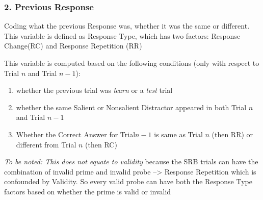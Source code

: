 \documentclass[
]{article}
\providecommand{\tightlist}{%
  \setlength{\itemsep}{0pt}\setlength{\parskip}{0pt}}
\begin{document}
\hypertarget{previous-response}{%
\subsubsection{2. Previous Response}\label{previous-response}}

Coding what the previous Response was, whether it was the same or
different. This variable is defined as Response Type, which has two
factors: Response Change(RC) and Response Repetition (RR)

This variable is computed based on the following conditions (only with
respect to Trial \(n\) and Trial \(n-1\)):

\begin{enumerate}
\def\labelenumi{\arabic{enumi}.}
\tightlist
\item
  whether the previous trial was \emph{learn} or a \emph{test} trial
\item
  whether the same Salient or Nonsalient Distractor appeared in both
  Trial \(n\) and Trial \(n-1\)
\item
  Whether the Correct Answer for Trial\(n-1\) is same as Trial \(n\)
  (then RR) or different from Trial \(n\) (then RC)
\end{enumerate}

\emph{To be noted: This does not equate to validity} because the SRB
trials can have the combination of invalid prime and invalid probe
--\textgreater{} Response Repetition which is confounded by Validity. So
every valid probe can have both the Response Type factors based on
whether the prime is valid or invalid
\end{document}
